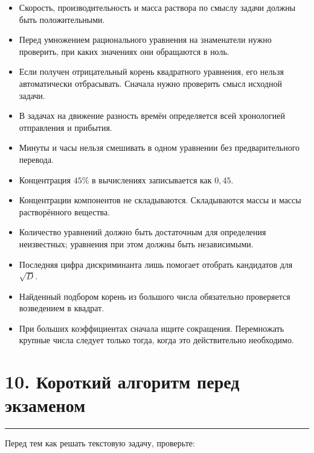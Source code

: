 \documentclass[a4paper,12pt]{article}
\newcommand{\checksection}[1]{%
  \section*{\color{darkaccent}#1}
  \vspace{-0.6em}
  {\color{accent!70}\rule{\linewidth}{0.6pt}}
  \vspace{0.35em}
}
\begin{document}
\begin{itemize}
  \item Скорость, производительность и масса раствора по смыслу задачи должны быть положительными.
  
  \item Перед умножением рационального уравнения на знаменатели нужно проверить, при каких значениях они обращаются в ноль.
  
  \item Если получен отрицательный корень квадратного уравнения, его нельзя автоматически отбрасывать. Сначала нужно проверить смысл исходной задачи.
  
  \item В задачах на движение разность времён определяется всей хронологией отправления и прибытия.
  
  \item Минуты и часы нельзя смешивать в одном уравнении без предварительного перевода.
  
  \item Концентрация \(45\%\) в вычислениях записывается как \(0{,}45\).
  
  \item Концентрации компонентов не складываются. Складываются массы и массы растворённого вещества.
  
  \item Количество уравнений должно быть достаточным для определения неизвестных; уравнения при этом должны быть независимыми.
  
  \item Последняя цифра дискриминанта лишь помогает отобрать кандидатов для \(\sqrt D\).
  
  \item Найденный подбором корень из большого числа обязательно проверяется возведением в квадрат.
  
  \item При больших коэффициентах сначала ищите сокращения. Перемножать крупные числа следует только тогда, когда это действительно необходимо.
\end{itemize}


\checksection{10. Короткий алгоритм перед экзаменом}

Перед тем как решать текстовую задачу, проверьте:
\end{document}

